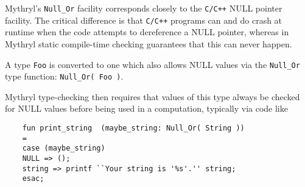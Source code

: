 
Mythryl's {\tt Null\_Or} facility corresponds closely to the {\tt C/C++} {\sc NULL} pointer 
facility.  The critical difference is that {\tt C/C++} programs can and do crash at 
runtime when the code attempts to dereference a {\sc NULL} pointer, whereas in Mythryl 
static compile-time checking guarantees that this can never happen.

A type {\tt Foo} is converted to one which also allows {\sc NULL} values via the 
{\tt Null\_Or} type function:  {\tt Null\_Or( Foo )}.

Mythryl type-checking then requires that values of this type always be checked 
for {\sc NULL} values before being used in a computation, typically via code like

\begin{verbatim}
    fun print_string  (maybe_string: Null_Or( String ))
	=
	case (maybe_string)
	NULL => ();
	string => printf ``Your string is '%s'.'' string;
	esac;
\end{verbatim}
